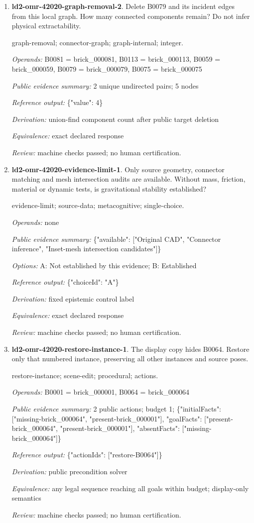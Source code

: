 \begin{enumerate}
\item \textbf{ld2-omr-42020-graph-removal-2}. Delete B0079 and its incident edges from this local graph. How many connected components remain? Do not infer physical extractability.
\par{\small graph-removal; connector-graph; graph-internal; integer.\par\textit{Operands:} B0081 = brick\_000081, B0113 = brick\_000113, B0059 = brick\_000059, B0079 = brick\_000079, B0075 = brick\_000075\par\textit{Public evidence summary:} 2 unique undirected pairs; 5 nodes\par\textit{Reference output:} \{"value": 4\}\par\textit{Derivation:} union-find component count after public target deletion\par\textit{Equivalence:} exact declared response\par\textit{Review:} machine checks passed; no human certification.}
\item \textbf{ld2-omr-42020-evidence-limit-1}. Only source geometry, connector matching and mesh intersection audits are available. Without mass, friction, material or dynamic tests, is gravitational stability established?
\par{\small evidence-limit; source-data; metacognitive; single-choice.\par\textit{Operands:} none\par\textit{Public evidence summary:} \{"available": ["Original CAD", "Connector inference", "Inset-mesh intersection candidates"]\}\par\textit{Options:} A: Not established by this evidence; B: Established\par\textit{Reference output:} \{"choiceId": "A"\}\par\textit{Derivation:} fixed epistemic control label\par\textit{Equivalence:} exact declared response\par\textit{Review:} machine checks passed; no human certification.}
\item \textbf{ld2-omr-42020-restore-instance-1}. The display copy hides B0064. Restore only that numbered instance, preserving all other instances and source poses.
\par{\small restore-instance; scene-edit; procedural; actions.\par\textit{Operands:} B0001 = brick\_000001, B0064 = brick\_000064\par\textit{Public evidence summary:} 2 public actions; budget 1; \{"initialFacts": ["missing-brick\_000064", "present-brick\_000001"], "goalFacts": ["present-brick\_000064", "present-brick\_000001"], "absentFacts": ["missing-brick\_000064"]\}\par\textit{Reference output:} \{"actionIds": ["restore-B0064"]\}\par\textit{Derivation:} public precondition solver\par\textit{Equivalence:} any legal sequence reaching all goals within budget; display-only semantics\par\textit{Review:} machine checks passed; no human certification.}

\end{enumerate}
